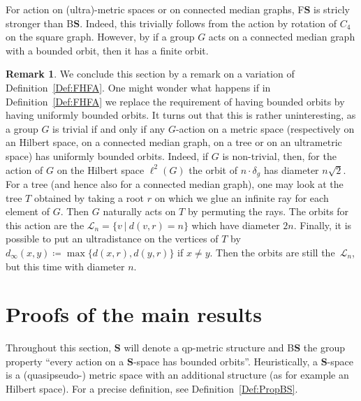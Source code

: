 \documentclass[a4paper]{article}
\newcounter{mycomment}
\newcommand{\mycomment}[2][]{\refstepcounter{mycomment}{\todo[color={green!33},size=\small]{\textbf{Commentaire [\uppercase{#1}\themycomment]:}~#2}}}
\newcommand{\PH}[1]{\todo[color={blue!33},size=small]{#1}}
\newcommand{\GS}[1]{\mycomment[GS]{#1}}
\theoremstyle{definition}
\newtheorem{rem}[lem]{Remark}
\newcommand*{\BS}{B$\mathbf{S}$}
\newcommand{\setst}[2]{\{#1\ |\ #2\}}
\begin{document}
For action on (ultra)-metric spaces or on connected median graphs, F$\mathbf S$ is stricly stronger than \BS. Indeed, this trivially follows from the action by rotation of $C_4$ on the square graph.
However,  by \cite{Cornulier2013,MR1663779} if a group $G$ acts on a connected median graph with a bounded orbit, then it has a finite orbit.
%
%
%
%
%
\begin{rem}
We conclude this section by a remark %
on a variation of Definition~\ref{Def:FHFA}.
One might wonder what happens if in Definition~\ref{Def:FHFA} we replace the requirement of having bounded orbits by having uniformly bounded orbits.
It turns out that this is rather uninteresting, as a group $G$ is trivial if and only if any $G$-action on a metric space (respectively on an Hilbert space, on a connected median graph, on a tree or on an ultrametric space) has uniformly bounded orbits.
Indeed, if $G$ is non-trivial, then, for the action of $G$ on the Hilbert space $\ell^2(G)$ the orbit of $n\cdot \delta_g$ has diameter $n\sqrt2$.
For a tree (and hence also for a connected median graph), one may look at the tree $T$ obtained by taking a root $r$ on which we glue an infinite ray for each element of $G$. Then $G$ naturally acts on $T$ by permuting the rays. The orbits for this action are the $\mathcal L_n=\setst{v}{d(v,r)=n}$ which have diameter $2n$.
Finally, it is possible to put an ultradistance on the vertices of $T$ by  $d_\infty(x,y)\coloneqq\max\{d(x,r),d(y,r)\}$ if $x\neq y$. Then the orbits are still the~$\mathcal L_n$, but this time with diameter $n$.
\end{rem}
%
%
%
%
%
%
%
%
\section{Proofs of the main results}
\label{Section:Proof}
%
%
%
Throughout this section, $\mathbf{S}$ will denote a qp-metric structure and \BS{} the group property ``every action on a $\mathbf{S}$-space has bounded orbits''.
Heuristically, a $\mathbf{S}$-space is a (quasipseudo-) metric space with an additional structure (as for example an Hilbert space). For a precise definition, see Definition~\ref{Def:PropBS}.
\end{document}
